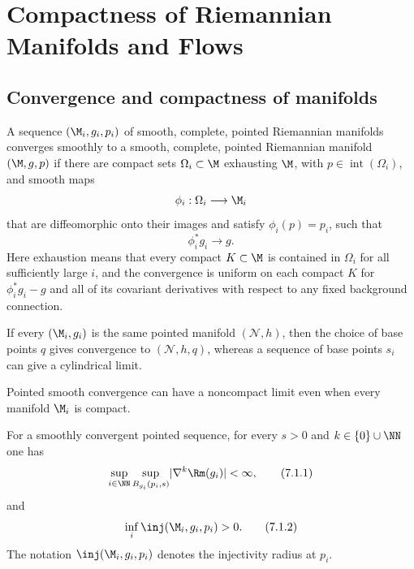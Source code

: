 \chapter{Compactness of Riemannian Manifolds and Flows}

\section{Convergence and compactness of manifolds}

\begin{definition}
\label{topping-ch7-pointed-cheeger-gromov-convergence}
A sequence $(\M_i,g_i,p_i)$ of smooth, complete, pointed Riemannian manifolds
converges smoothly to a smooth, complete, pointed Riemannian manifold
$(\M,g,p)$ if there are compact sets $\Omega_i\subset\M$ exhausting $\M$, with
$p\in\operatorname{int}(\Omega_i)$, and smooth maps
\[
\phi_i:\Omega_i\longrightarrow\M_i
\]
that are diffeomorphic onto their images and satisfy $\phi_i(p)=p_i$, such that
\[
\phi_i^*g_i\longrightarrow g.
\]
Here exhaustion means that every compact $K\subset\M$ is contained in
$\Omega_i$ for all sufficiently large $i$, and the convergence is uniform on
each compact $K$ for $\phi_i^*g_i-g$ and all of its covariant derivatives with
respect to any fixed background connection.
\end{definition}

\begin{remark}
\label{topping-ch7-pointed-convergence-example}
If every $(\M_i,g_i)$ is the same pointed manifold $(\mathcal{N},h)$, then the
choice of base points $q$ gives convergence to $(\mathcal{N},h,q)$, whereas a
sequence of base points $s_i$ can give a cylindrical limit.
\end{remark}

\begin{remark}
\label{topping-ch7-compact-limit-possible}
Pointed smooth convergence can have a noncompact limit even when every
manifold $\M_i$ is compact.
\end{remark}

For a smoothly convergent pointed sequence, for every $s>0$ and
$k\in\{0\}\cup\NN$ one has
\[
\sup_{i\in\NN}\sup_{B_{g_i}(p_i,s)}\lvert\nabla^k\Rm(g_i)\rvert<\infty,
\tag{7.1.1}
\]
and
\[
\inf_i\inj(\M_i,g_i,p_i)>0.
\tag{7.1.2}
\]
The notation $\inj(\M_i,g_i,p_i)$ denotes the injectivity radius at $p_i$.

